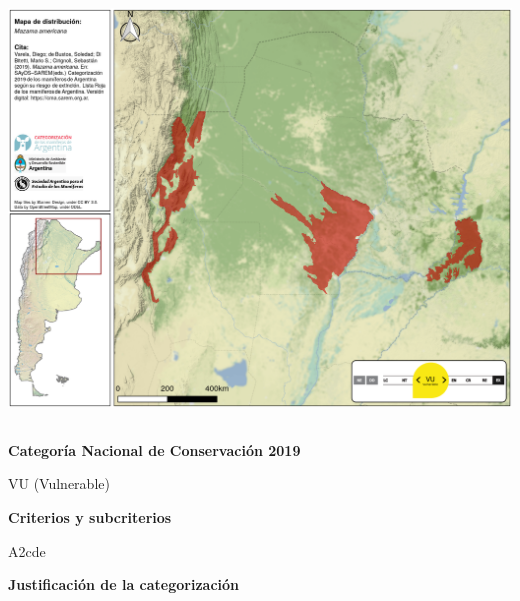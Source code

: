 \documentclass[
  x11names]{article}
\begin{document}
\includegraphics[width=1\linewidth]{maps/Cetartiodactyla/Mazama_americana}

%
\begin{table}[H]
\centering
\begin{tabular}[t]{>{\raggedright\arraybackslash}m{16cm}>{}m{16cm}}
\toprule
\cellcolor{ceil}{\textcolor{white}{\textbf{\rule{0pt}{14pt}CATEGORÍAS DE CONSERVACIÓN}}}\\
\bottomrule
\end{tabular}
\end{table}

\vspace{-0.4cm}

\textbf{Categoría Nacional de Conservación 2019}

VU (Vulnerable)

\textbf{Criterios y subcriterios}

A2cde

\textbf{Justificación de la categorización}
\end{document}
